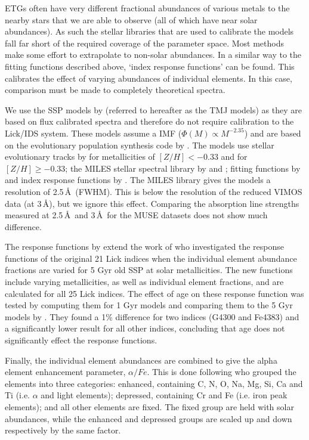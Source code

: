 			ETGs often have very different fractional abundances of various metals to the nearby stars that we are able to observe (all of which have near solar abundances). As such the stellar libraries that are used to calibrate the models fall far short of the required coverage of the parameter space. Most methods make some effort to extrapolate to non-solar abundances. In a similar way to the fitting functions described above, `index response functions' can be found. This calibrates the effect of varying abundances of individual elements. In this case, comparison must be made to completely theoretical spectra.

			We use the SSP models by \citet{Thomas2010} (referred to hereafter as the TMJ models) as they are based on flux calibrated spectra and therefore do not require calibration to the Lick/IDS system. These models assume a \citet{Salpeter1955} IMF ($\Phi(M) \propto M^{-2.35}$) and are based on the evolutionary population synthesis code by \citet{Maraston1998}. The models use stellar evolutionary tracks by \citet{Cassisi1997} for metallicities of $[Z/H] < -0.33$ and \citet{Girardi2000} for $[Z/H] \ge -0.33$; the MILES stellar spectral library by \citet{Sanchez-Blazquez2006a} and \citet{Falcon-Barroso2011a}; fitting functions by \citet{Johansson2010} and index response functions by \citet{Korn2005}. The MILES library gives the models a resolution of 2.5\,\AA\ (FWHM). This is below the resolution of the reduced VIMOS data (at 3\,\AA), but we ignore this effect. Comparing the absorption line strengths measured at 2.5\,\AA\ and 3\,\AA\ for the MUSE datasets does not show much difference.

			The response functions by \citet{Korn2005} extend the work of \citet{Tripicco1995} who investigated the response functions of the original 21 Lick indices when the individual element abundance fractions are varied for 5 Gyr old SSP at solar metallicities. The new functions include varying metallicities, as well as individual element fractions, and are calculated for all 25 Lick indices. The effect of age on these response function was tested by computing them for 1 Gyr models and comparing them to the 5 Gyr models by \citet{Tripicco1995}. They found a 1\% difference for two indices (G4300 and Fe4383) and a significantly lower result for all other indices, concluding that age does not significantly effect the response functions.

			Finally, the individual element abundances are combined to give the alpha element enhancement parameter, $\alpha/Fe$. This is done following \citet{Trager2000} who grouped the elements into three categories: enhanced, containing C, N, O, Na, Mg, Si, Ca and Ti (i.e. $\alpha$ and light elements); depressed, containing Cr and Fe (i.e. iron peak elements); and all other elements are fixed. The fixed group are held with solar abundances, while the enhanced and depressed groups are scaled up and down respectively by the same factor. 

